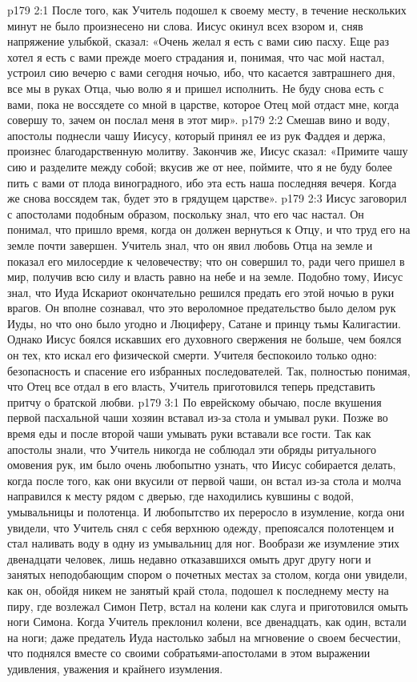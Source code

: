 \vs p179 2:1 После того, как Учитель подошел к своему месту, в течение нескольких минут не было произнесено ни слова. Иисус окинул всех взором и, сняв напряжение улыбкой, сказал: «Очень желал я есть с вами сию пасху. Еще раз хотел я есть с вами прежде моего страдания и, понимая, что час мой настал, устроил сию вечерю с вами сегодня ночью, ибо, что касается завтрашнего дня, все мы в руках Отца, чью волю я и пришел исполнить. Не буду снова есть с вами, пока не воссядете со мной в царстве, которое Отец мой отдаст мне, когда совершу то, зачем он послал меня в этот мир».
\vs p179 2:2 Смешав вино и воду, апостолы поднесли чашу Иисусу, который принял ее из рук Фаддея и держа, произнес благодарственную молитву. Закончив же, Иисус сказал: «Примите чашу сию и разделите между собой; вкусив же от нее, поймите, что я не буду более пить с вами от плода виноградного, ибо эта есть наша последняя вечеря. Когда же снова воссядем так, будет это в грядущем царстве».
\vs p179 2:3 Иисус заговорил с апостолами подобным образом, поскольку знал, что его час настал. Он понимал, что пришло время, когда он должен вернуться к Отцу, и что труд его на земле почти завершен. Учитель знал, что он явил любовь Отца на земле и показал его милосердие к человечеству; что он совершил то, ради чего пришел в мир, получив всю силу и власть равно на небе и на земле. Подобно тому, Иисус знал, что Иуда Искариот окончательно решился предать его этой ночью в руки врагов. Он вполне сознавал, что это вероломное предательство было делом рук Иуды, но что оно было угодно и Люциферу, Сатане и принцу тьмы Калигастии. Однако Иисус боялся искавших его духовного свержения не больше, чем боялся он тех, кто искал его физической смерти. Учителя беспокоило только одно: безопасность и спасение его избранных последователей. Так, полностью понимая, что Отец все отдал в его власть, Учитель приготовился теперь представить притчу о братской любви.
\vs p179 3:1 По еврейскому обычаю, после вкушения первой пасхальной чаши хозяин вставал из\hyp{}за стола и умывал руки. Позже во время еды и после второй чаши умывать руки вставали все гости. Так как апостолы знали, что Учитель никогда не соблюдал эти обряды ритуального омовения рук, им было очень любопытно узнать, что Иисус собирается делать, когда после того, как они вкусили от первой чаши, он встал из\hyp{}за стола и молча направился к месту рядом с дверью, где находились кувшины с водой, умывальницы и полотенца. И любопытство их переросло в изумление, когда они увидели, что Учитель снял с себя верхнюю одежду, препоясался полотенцем и стал наливать воду в одну из умывальниц для ног. Вообрази же изумление этих двенадцати человек, лишь недавно отказавшихся омыть друг другу ноги и занятых неподобающим спором о почетных местах за столом, когда они увидели, как он, обойдя никем не занятый край стола, подошел к последнему месту на пиру, где возлежал Симон Петр, встал на колени как слуга и приготовился омыть ноги Симона. Когда Учитель преклонил колени, все двенадцать, как один, встали на ноги; даже предатель Иуда настолько забыл на мгновение о своем бесчестии, что поднялся вместе со своими собратьями\hyp{}апостолами в этом выражении удивления, уважения и крайнего изумления.
